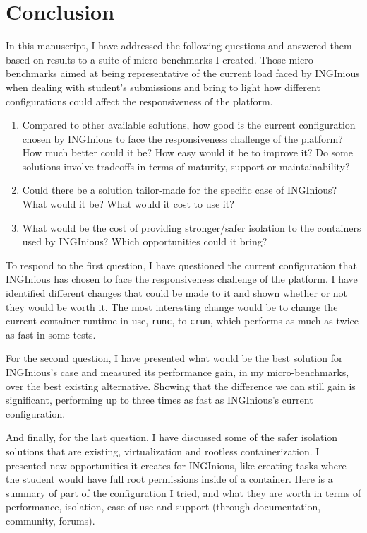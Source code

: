 \chapter{Conclusion}

In this manuscript, I have addressed the following questions and answered them based on results to a suite of micro-benchmarks I created.  Those micro-benchmarks aimed at being representative of the current load faced by INGInious when dealing with student's submissions and bring to light how different configurations could affect the responsiveness of the platform.

\begin{enumerate}
  \item Compared to other available solutions, how good is the current configuration chosen by INGInious to face the responsiveness challenge of the platform?  How much better could it be?  How easy would it be to improve it?  Do some solutions involve tradeoffs in terms of maturity, support or maintainability?
  \item Could there be a solution tailor-made for the specific case of INGInious?  What would it be?  What would it cost to use it?
  \item What would be the cost of providing stronger/safer isolation to the containers used by INGInious?  Which opportunities could it bring?
\end{enumerate}

To respond to the first question, I have questioned the current configuration that INGInious has chosen to face the responsiveness challenge of the platform.  I have identified different changes that could be made to it and shown whether or not they would be worth it.  The most interesting change would be to change the current container runtime in use, \texttt{runc}, to \texttt{crun}, which performs as much as twice as fast in some tests.

For the second question, I have presented what would be the best solution for INGInious's case and measured its performance gain, in my micro-benchmarks, over the best existing alternative.  Showing that the difference we can still gain is significant, performing up to three times as fast as INGInious's current configuration.

And finally, for the last question, I have discussed some of the safer isolation solutions that are existing, virtualization and rootless containerization.  I presented new opportunities it creates for INGInious, like creating tasks where the student would have full root permissions inside of a container.  Here is a summary of part of the configuration I tried, and what they are worth in terms of performance, isolation, ease of use and support (through documentation, community, forums).

